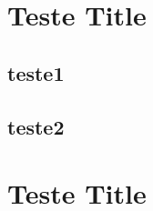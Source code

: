 \blindtext

\section{Teste Title}
\blindtext

\subsection{teste1}
\blindtext

\subsection{teste2}
\blindtext

\section{Teste Title}
\blindtext